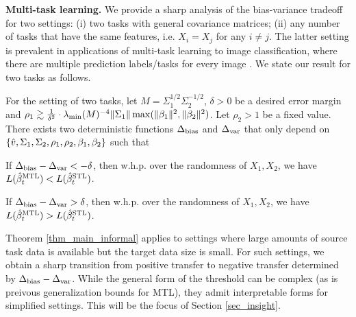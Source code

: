 \textbf{Multi-task learning.}
We provide a sharp analysis of the bias-variance tradeoff for two settings:
(i) two tasks with general covariance matrices;
(ii) any number of tasks that have the same features, i.e. $X_i = X_j$ for any $i\neq j$.
The latter setting is prevalent in applications of multi-task learning to image classification, where there are multiple prediction labels/tasks for every image \cite{chexnet17,EA20}.
We state our result for two tasks as follows.
\begin{theorem}\label{thm_main_informal}
	For the setting of two tasks, let $M=\Sigma_1^{1/2}\Sigma_2^{-1/2}$, $\delta > 0$ be a desired error margin and $\rho_1 \gtrsim \frac{1}{\delta^2}\cdot \lambda_{\min}(M)^{-4} \|\Sigma_1\| \max(\|\beta_1\|^2, \|\beta_2\|^2)$.
	Let $\rho_2 > 1$ be a fixed value.
 	There exists two deterministic functions $\Delta_{\text{bias}}$ and $\Delta_{\text{var}}$ that only depend on $\{\hat{v}, \Sigma_1, \Sigma_2, \rho_1, \rho_2, \beta_1, \beta_2\}$ such that
	\squishlist
		\item If $\Delta_{\text{bias}} - \Delta_{\text{var}} < -\delta$, then w.h.p. over the randomness of $X_1, X_2$, we have $L(\hat{\beta}_t^{\text{MTL}}) < L(\hat{\beta}_t^{\text{STL}})$.
		\item If $\Delta_{\text{bias}} - \Delta_{\text{var}} > \delta$, then w.h.p. over the randomness of $X_1, X_2$, we have $L(\hat{\beta}_t^{\text{MTL}}) > L(\hat{\beta}_t^{\text{STL}})$.
	\squishend
\end{theorem}

Theorem \ref{thm_main_informal} applies to settings where large amounts of source task data is available but the target data size is small.
For such settings, we obtain a sharp transition from positive transfer to negative transfer determined by $\Delta_{\text{bias}} - \Delta_{\text{var}}$.
While the general form of the threshold can be complex (as is preivous generalization bounds for MTL), they admit interpretable forms for simplified settings.
This will be the focus of Section \ref{sec_insight}.


